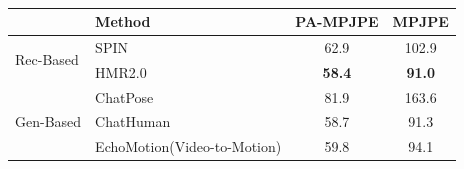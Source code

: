 
\begin{table}[t]
    \centering
    \caption{}
    \label{tab:hmr_comparison}
    \begin{tabular}{llcc} 
        \toprule
        & Method & PA-MPJPE  & MPJPE   \\
        \midrule
        \multirow{2}{*}{{Rec-Based}} & SPIN \citep{spin}  & 62.9 & 102.9 \\
        & HMR2.0 \citep{hmr2} & \textbf{58.4} & \textbf{91.0}  \\
        \midrule
        \multirow{3}{*}{{Gen-Based}} & ChatPose \citep{chatpose} & 81.9 & 163.6  \\
        & ChatHuman \citep{chathuman} & 58.7 & 91.3 \\
        & EchoMotion(Video-to-Motion) & 59.8 & 94.1  \\
        \bottomrule
    \end{tabular}

\end{table}

